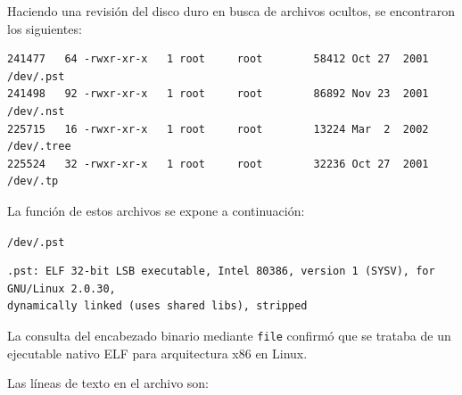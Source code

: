 Haciendo una revisión del disco duro en busca de archivos ocultos,
se encontraron los siguientes:

\vspace{1em}

\begin{lstlisting}[style=terminal]
241477   64 -rwxr-xr-x   1 root     root        58412 Oct 27  2001 /dev/.pst
241498   92 -rwxr-xr-x   1 root     root        86892 Nov 23  2001 /dev/.nst
225715   16 -rwxr-xr-x   1 root     root        13224 Mar  2  2002 /dev/.tree
225524   32 -rwxr-xr-x   1 root     root        32236 Oct 27  2001 /dev/.tp
\end{lstlisting}

\vspace{1em}

 
La función de estos archivos se expone a continuación:
 

\texttt{/dev/.pst}

 \vspace{1em}

\begin{lstlisting}[style=terminal] 
.pst: ELF 32-bit LSB executable, Intel 80386, version 1 (SYSV), for GNU/Linux 2.0.30, 
dynamically linked (uses shared libs), stripped
 \end{lstlisting}

\vspace{1em}

 La consulta del encabezado binario mediante \texttt{file} confirmó que se trataba de un ejecutable nativo ELF para arquitectura x86 en Linux.

 Las líneas de texto en el archivo son:
 
\vspace{1em}

